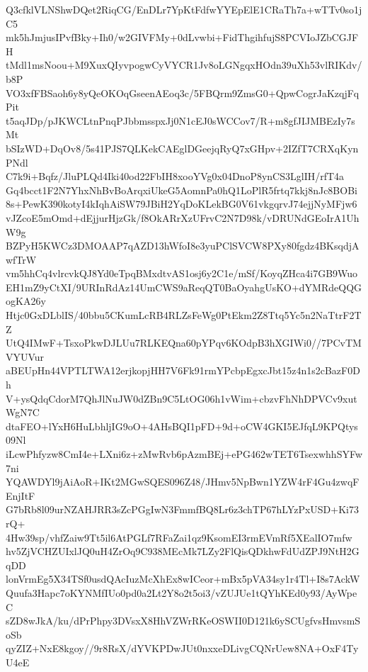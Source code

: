 Q3cfklVLNShwDQet2RiqCG/EnDLr7YpKtFdfwYYEpElE1CRaTh7a+wTTv0so1jC5
mk5hJmjusIPvfBky+Ih0/w2GIVFMy+0dLvwbi+FidThgihfujS8PCVIoJZbCGJFH
tMdl1msNoou+M9XuxQIyvpogwCyVYCR1Jv8oLGNgqxHOdn39uXh53vlRIKdv/b8P
VO3xfFBSaoh6y8yQeOKOqGseenAEoq3c/5FBQrm9ZmsG0+QpwCogrJaKzqjFqPit
t5aqJDp/pJKWCLtnPnqPJbbmsspxJj0N1cEJ0sWCCov7/R+m8gfJIJMBEzIy7sMt
bSIzWD+DqOv8/5s41PJS7QLKekCAEglDGeejqRyQ7xGHpv+2IZfT7CRXqKynPNdl
C7k9i+Bqfz/JluPLQd4Iki40od22FbIH8xooYVg0x04DnoP8ynCS3LglIH/rfT4a
Gq4bcct1F2N7YhxNhBvBoArqxiUkeG5AomnPa0hQ1LoPlR5frtq7kkj8nJc8BOBi
8s+PewK390kotyI4kIqhAiSW79JBiH2YqDoKLekBG0V61vkgqrvJ74ejjNyMFjw6
vJZcoE5mOmd+dEjjurHjzGk/f8OkARrXzUFrvC2N7D98k/vDRUNdGEoIrA1UhW9g
BZPyH5KWCz3DMOAAP7qAZD13hWfoI8e3yuPClSVCW8PXy80fgdz4BKsqdjAwfTrW
vm5hhCq4vlrcvkQJ8Yd0eTpqBMxdtvAS1osj6y2C1e/mSf/KoyqZHca4i7GB9Wuo
EH1mZ9yCtXI/9URInRdAz14UmCWS9aReqQT0BaOyahgUsKO+dYMRdeQQGogKA26y
Htjc0GxDLblIS/40bbu5CKumLcRB4RLZsFeWg0PtEkm2Z8Ttq5Yc5n2NaTtrF2TZ
UtQ4IMwF+TsxoPkwDJLUu7RLKEQna60pYPqv6KOdpB3hXGIWi0//7PCvTMVYUVur
aBEUpHn44VPTLTWA12erjkopjHH7V6Fk91rmYPcbpEgxcJbt15z4n1s2cBazF0Dh
V+ysQdqCdorM7QhJlNuJW0dZBn9C5LtOG06h1vWim+cbzvFhNhDPVCv9xutWgN7C
dtaFEO+lYxH6HuLbhljIG9oO+4AHsBQI1pFD+9d+oCW4GKI5EJfqL9KPQtys09Nl
iLcwPhfyzw8CmI4e+LXni6z+zMwRvb6pAzmBEj+ePG462wTET6TsexwhhSYFw7ni
YQAWDYl9jAiAoR+IKt2MGwSQES096Z48/JHmv5NpBwn1YZW4rF4Gu4zwqFEnjItF
G7bRb8l09urNZAHJRR3sZcPGgIwN3FmmfBQ8Lr6z3chTP67hLYzPxUSD+Ki73rQ+
4Hw39sp/vhfZaiw9Tt5il6AtPGLf7RFaZai1qz9KsomEI3rmEVmRf5XEalIO7mfw
hv5ZjVCHZUIxlJQ0uH4ZrOq9C938MEcMk7LZy2FlQisQDkhwFdUdZPJ9NtH2GqDD
lonVrmEg5X34TSf0usdQAcIuzMcXhEx8wICeor+mBx5pVA34sy1r4Tl+I8s7AckW
Quufa3Hapc7oKYNMfIUo0pd0a2Lt2Y8o2t5oi3/vZUJUe1tQYhKEd0y93/AyWpeC
sZD8wJkA/ku/dPrPhpy3DVsxX8HhVZWrRKeOSWII0D121k6ySCUgfvsHmvsmSoSb
qyZIZ+NxE8kgoy//9r8RsX/dYVKPDwJUt0nxxeDLivgCQNrUew8NA+OxF4TyU4eE
